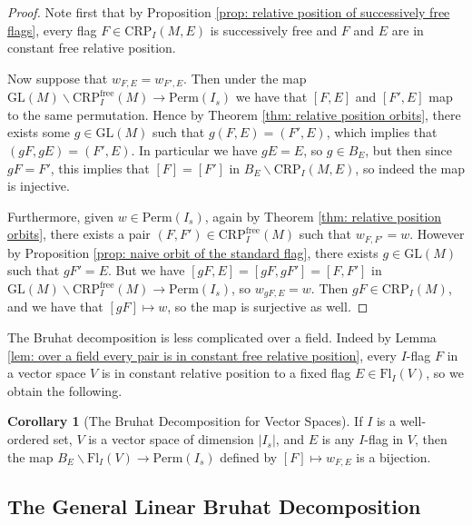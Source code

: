 \documentclass[oneside,11pt]{amsart}
\newcommand{\free}{\ensuremath{\text{free}}}
\newcommand{\CRP}{\ensuremath{\text{CRP}}}
\newcommand{\GL}{\ensuremath{\text{GL}}}
\newcommand{\Fl}{\ensuremath{\text{Fl}}}
\newcommand{\Perm}{\ensuremath{\text{Perm}}}
\theoremstyle{definition}
\newtheorem{proof techniques}{Proof Techniques}
\newtheorem{corollary}{Corollary}
\begin{document}
\begin{proof}
Note first that by Proposition \ref{prop: relative position of successively free flags}, every flag $F \in \CRP_I(M , E)$ is successively free and $F$ and $E$ are in constant free relative position. 

Now suppose that $w_{F , E} = w_{F', E}$. Then under the map $\GL(M) \backslash \CRP^\free_I(M) \to \Perm(I_s)$ we have that $[F , E]$ and $[F' , E]$ map to the same permutation. Hence by Theorem \ref{thm: relative position orbits}, there exists some $g \in \GL(M)$ such that $g (F , E) = (F' , E)$, which implies that $(gF , gE) = (F' , E)$. In particular we have $gE = E$, so $g \in B_E$, but then since $gF = F'$, this implies that $[F] = [F']$ in $B_E \backslash \CRP_I(M , E)$, so indeed the map is injective. 

Furthermore, given $w \in \Perm(I_s)$, again by Theorem \ref{thm: relative position orbits}, there exists a pair $(F , F') \in \CRP^\free_I(M)$ such that $w_{F , F'} = w$. However by Proposition \ref{prop: naive orbit of the standard flag}, there exists $g \in \GL(M)$ such that $g F' = E$. But we have $[gF , E] = [gF , gF'] = [F , F']$ in $\GL(M) \backslash \CRP^\free_I(M) \to \Perm(I_s)$, so $w_{gF , E} = w$. Then $gF \in \CRP_I(M)$, and we have that $[gF] \mapsto w$, so the map is surjective as well. 
\end{proof}

The Bruhat decomposition is less complicated over a field. Indeed by Lemma \ref{lem: over a field every pair is in constant free relative position}, every $I$-flag $F$ in a vector space $V$ is in constant relative position to a fixed flag $E \in \Fl_I(V)$, so we obtain the following. 

\begin{corollary}[The Bruhat Decomposition for Vector Spaces]\label{cor: the bruhat decomposition for vector spaces}
If $I$ is a well-ordered set, $V$ is a vector space of dimension $|I_s|$, and $E$ is any $I$-flag in $V$, then the map $B_E \backslash \Fl_I(V) \to \Perm(I_s)$ defined by $[F] \mapsto w_{F , E}$ is a bijection. 
\end{corollary}




\subsection{The General Linear Bruhat Decomposition}
\end{document}
